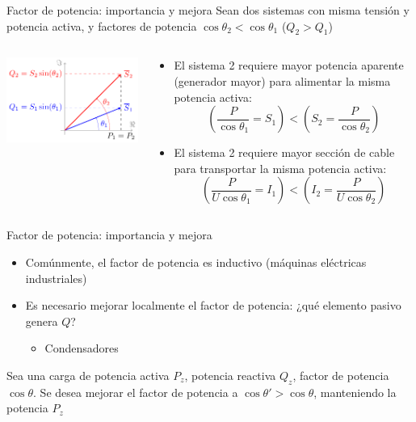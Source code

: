 \documentclass[aspectratio=169, xcolor={usenames,svgnames,dvipsnames}]{beamer}
\begin{document}
\begin{frame}{Factor de potencia: importancia y mejora}
Sean dos sistemas con \alert{misma tensión y potencia activa}, y factores de potencia \(\cos \theta_2 < \cos \theta_1\) (\(Q_2 > Q_1\))
\begin{columns}
\begin{column}{0.4\linewidth}
\begin{center}
\includegraphics[width=\linewidth]{../figs/fasorescompensacionreactiva.pdf}
\end{center}
\end{column}
\begin{column}{0.6\linewidth}
\begin{itemize}
    \item El sistema 2 requiere \alert{mayor potencia aparente} (generador mayor) para alimentar la misma potencia activa:
\[
  \left(\frac{P}{\cos \theta_1} = S_1 \right) < \left( S_2 = \frac{P}{\cos \theta_2}\right) 
\]
\item El sistema 2 requiere \alert{mayor sección} de cable para transportar la misma potencia activa:
\[
  \left(\frac{P}{U \cos \theta_1} = I_1 \right) < \left( I_2 = \frac{P}{U \cos \theta_2}\right) 
\]
\end{itemize}
\end{column}
\end{columns}
\end{frame}

\begin{frame}{Factor de potencia: importancia y mejora}
\begin{itemize}
\item Comúnmente, el factor de potencia es \alert{inductivo} (máquinas eléctricas
industriales)
\item Es necesario mejorar \alert{localmente} el factor de potencia: ¿qué elemento pasivo genera $Q$?
\pause\begin{itemize}
    \item \alert{Condensadores}
\end{itemize}
\end{itemize}

Sea una carga de potencia activa \(P_z\), potencia reactiva \(Q_z\), factor de potencia \(\cos\theta\). Se desea \alert{mejorar el factor de potencia} a \(\cos \theta' > \cos \theta\), manteniendo la potencia $P_z$
\end{frame}
\end{document}
